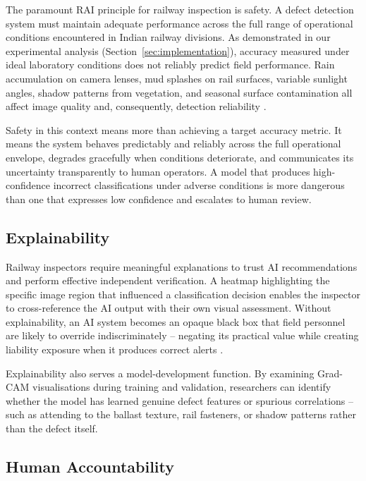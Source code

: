 \documentclass[conference]{IEEE}
\begin{document}
The paramount RAI principle for railway inspection is safety. A defect detection system must maintain adequate performance across the full range of operational conditions encountered in Indian railway divisions. As demonstrated in our experimental analysis (Section~\ref{sec:implementation}), accuracy measured under ideal laboratory conditions does not reliably predict field performance. Rain accumulation on camera lenses, mud splashes on rail surfaces, variable sunlight angles, shadow patterns from vegetation, and seasonal surface contamination all affect image quality and, consequently, detection reliability \cite{ieee2025}.

Safety in this context means more than achieving a target accuracy metric. It means the system behaves predictably and reliably across the full operational envelope, degrades gracefully when conditions deteriorate, and communicates its uncertainty transparently to human operators. A model that produces high-confidence incorrect classifications under adverse conditions is more dangerous than one that expresses low confidence and escalates to human review.

\subsection{Explainability}

Railway inspectors require meaningful explanations to trust AI recommendations and perform effective independent verification. A heatmap highlighting the specific image region that influenced a classification decision enables the inspector to cross-reference the AI output with their own visual assessment. Without explainability, an AI system becomes an opaque black box that field personnel are likely to override indiscriminately -- negating its practical value while creating liability exposure when it produces correct alerts \cite{kumar2025}.

Explainability also serves a model-development function. By examining Grad-CAM visualisations during training and validation, researchers can identify whether the model has learned genuine defect features or spurious correlations -- such as attending to the ballast texture, rail fasteners, or shadow patterns rather than the defect itself.

\subsection{Human Accountability}
\end{document}
